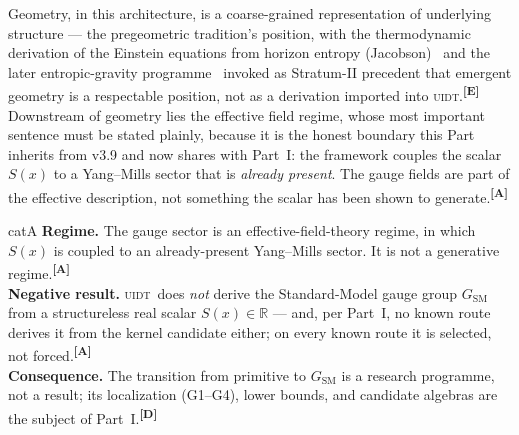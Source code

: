 \documentclass[12pt,a4paper,twoside]{article}
\theoremstyle{plain}
\theoremstyle{definition}
\theoremstyle{remark}
\newcommand{\UIDT}{\textsc{uidt}} %
\newcommand{\catmark}[1]{\textsuperscript{\textsf{\textbf{[#1]}}}}
\begin{document}
Geometry, in this architecture, is a coarse-grained representation of
underlying structure --- the pregeometric tradition's position, with the
thermodynamic derivation of the Einstein equations from horizon entropy
(Jacobson)~\cite{jacobson1995} and the later entropic-gravity programme~\cite{padmanabhan2010,verlinde2011,chirco2014} invoked as
Stratum-II precedent that emergent geometry is a respectable position,
not as a derivation imported into \UIDT.\catmark{E} Downstream of
geometry lies the effective field regime, whose most important sentence
must be stated plainly, because it is the honest boundary this Part
inherits from v3.9 and now shares with Part~I: the framework couples the
scalar $S(x)$ to a Yang--Mills sector that is \emph{already present}.
The gauge fields are part of the effective description, not something
the scalar has been shown to generate.\catmark{A}

\begin{evidencebox}{catA}
\textbf{Regime.} The gauge sector is an effective-field-theory regime,
in which $S(x)$ is coupled to an already-present Yang--Mills sector. It
is not a generative regime.\catmark{A}\\[0.3em]
\textbf{Negative result.} \UIDT\ does \emph{not} derive the
Standard-Model gauge group $G_{\mathrm{SM}}$ from a structureless real
scalar $S(x)\in\mathbb{R}$ --- and, per Part~I, no known route derives
it from the kernel candidate either; on every known route it is
selected, not forced.\catmark{A}\\[0.3em]
\textbf{Consequence.} The transition from primitive to
$G_{\mathrm{SM}}$ is a research programme, not a result; its
localization (G1--G4), lower bounds, and candidate algebras are the
subject of Part~I.\catmark{D}
\end{evidencebox}

\newpage
\end{document}
